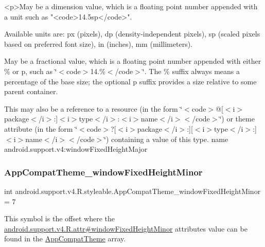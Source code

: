 \begin{DoxyVerb}      <p>May be a dimension value, which is a floating point number appended with a unit such as "<code>14.5sp</code>".
\end{DoxyVerb}
 Available units are\+: px (pixels), dp (density-\/independent pixels), sp (scaled pixels based on preferred font size), in (inches), mm (millimeters). 

May be a fractional value, which is a floating point number appended with either \% or p, such as \char`\"{}$<$code$>$14.\%$<$/code$>$\char`\"{}. The \% suffix always means a percentage of the base size; the optional p suffix provides a size relative to some parent container. 

This may also be a reference to a resource (in the form \char`\"{}$<$code$>$@\mbox{[}$<$i$>$package$<$/i$>$\+:\mbox{]}$<$i$>$type$<$/i$>$\+:$<$i$>$name$<$/i$>$$<$/code$>$\char`\"{}) or theme attribute (in the form \char`\"{}$<$code$>$?\mbox{[}$<$i$>$package$<$/i$>$\+:\mbox{]}\mbox{[}$<$i$>$type$<$/i$>$\+:\mbox{]}$<$i$>$name$<$/i$>$$<$/code$>$\char`\"{}) containing a value of this type.  name android.\+support.\+v4\+:window\+Fixed\+Height\+Major \mbox{\label{classandroid_1_1support_1_1v4_1_1R_1_1styleable_a8406ab28fcb798abe69bcc846a2e8a7d}} 
\subsubsection{\texorpdfstring{App\+Compat\+Theme\+\_\+window\+Fixed\+Height\+Minor}{AppCompatTheme\_windowFixedHeightMinor}}
{\footnotesize\ttfamily int android.\+support.\+v4.\+R.\+styleable.\+App\+Compat\+Theme\+\_\+window\+Fixed\+Height\+Minor = 7\hspace{0.3cm}{\ttfamily [static]}}

This symbol is the offset where the \hyperlink{classandroid_1_1support_1_1v4_1_1R_1_1attr_a5d8371968478fdd70167d3680af2df23}{android.\+support.\+v4.\+R.\+attr\#window\+Fixed\+Height\+Minor} attribute\textquotesingle{}s value can be found in the \hyperlink{classandroid_1_1support_1_1v4_1_1R_1_1styleable_ac07ebbe62ed977f6dcaadc6397840ace}{App\+Compat\+Theme} array.

